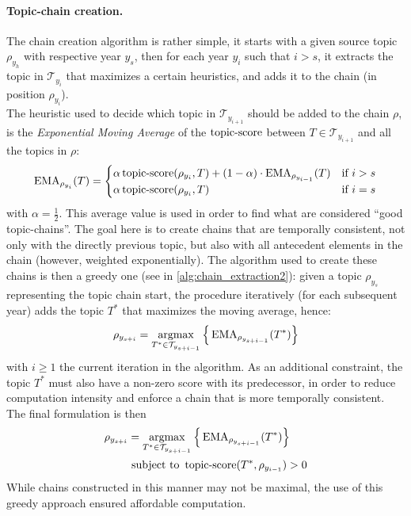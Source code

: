 \paragraph{\textbf{Topic-chain creation.}}The chain creation algorithm is rather simple, it starts with a given source topic $\rho_{y_h}$ with respective year $y_s$, then for each year $y_i$ such that $i>s$, it extracts the topic in $\mathcal{T}_{y_i}$ that maximizes a certain heuristics, and adds it to the chain (in position $\rho_{y_i}$).\\
The heuristic used to decide which topic in $\mathcal{T}_{y_{i+1}}$ should be added to the chain $\rho$, is the \textit{Exponential Moving Average} of the $\mathop{\mathrm{topic\text{-}score}}$ between $T\in\mathcal T_{y_{i+1}}$ and all the topics in $\rho$: 
$$ \operatorname{EMA}_{\rho_{y_i}}(T) = \begin{cases}
 \alpha  \mathop{\mathrm{topic\text{-}score}}(\rho_{y_i}, T) + (1-\alpha) \cdot \operatorname{EMA}_{\rho_{y_{i-1}}}(T) &\text{if $i>s$}\\
\alpha\mathop{\mathrm{topic\text{-}score}}(\rho_{y_i}, T) & \text{if $i=s$}
\end{cases}
$$
with $\alpha = \frac{1}{2}$.
This average value is used in order to find what are considered \enquote{good topic-chains}. The goal here is to create chains that are temporally consistent, not only with the directly previous topic, but also with all antecedent elements in the chain (however, weighted exponentially). The algorithm used to create these chains is then a greedy one (see \CandidateChain{} in \cref{alg:chain_extraction2}): given a topic $\rho_{y_s}$ representing the topic chain start, the procedure iteratively (for each subsequent year) adds the topic $T^*$  that maximizes the moving average, hence: 
$$\rho_{y_{s+i}} = \mathop{\mathrm{argmax}}_{T^*\in \mathcal T_{y_{s+i-1}}} \Big\{\operatorname{EMA}_{\rho_{y_{s+i-1}}}(T^*)\Big\}$$ 
with $i\ge 1$ the current iteration in the algorithm. As an additional constraint, the topic $T^*$ must also have a non-zero score with its predecessor, in order to reduce computation intensity and enforce a chain that is more temporally consistent. The final formulation is then 
\begin{align*}
\rho_{y_{s+i}} &= \mathop{\mathrm{argmax}}_{T^*\in \mathcal T_{y_{s+i-1}}} \Big\{\operatorname{EMA}_{\rho_{y_{s+i-1}}}(T^*)\Big\}\\&\text{ subject to } \mathop{\mathrm{topic\text{-}score}}(T^*,\rho_{y_{i-1}})>0
\end{align*}
While chains constructed in this manner may not be maximal, the use of this greedy approach ensured affordable computation.

